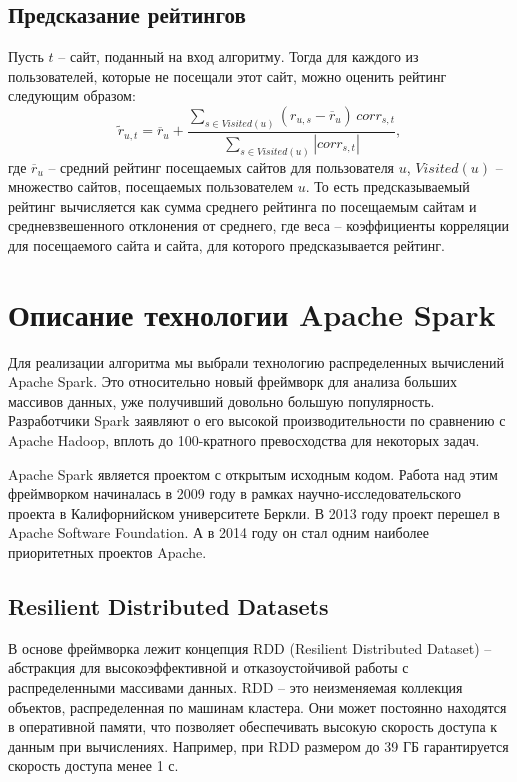 \documentclass[12pt,a4paper]{report}
\newcommand*\mean[1]{\overline{#1}}
\newcommand\abs[1]{\left|#1\right|}
\begin{document}
\subsection{Предсказание рейтингов} 

Пусть $t$ -- сайт, поданный на вход алгоритму. Тогда для каждого из пользователей, которые не посещали этот сайт, можно оценить рейтинг следующим образом:
\begin{equation}
\widetilde{r}_{u,t} = \mean{r}_u + \frac{\sum\limits_{s \in Visited(u)}{ (r_{u,s} - \mean{r}_u) \, corr_{s,t}} }{ \sum\limits_{s \in Visited(u)}{\abs{corr_{s,t}}} } ,
\end{equation}
где $\mean{r}_u$ -- средний рейтинг посещаемых сайтов для пользователя $u$, $Visited(u)$ -- множество сайтов, посещаемых пользователем $u$. То есть предсказываемый рейтинг вычисляется как сумма среднего рейтинга по посещаемым сайтам и средневзвешенного отклонения от среднего, где веса -- коэффициенты корреляции для посещаемого сайта и сайта, для которого предсказывается рейтинг.

\newpage

\section{Описание технологии Apache Spark}

Для реализации алгоритма мы выбрали технологию распределенных вычислений Apache Spark. Это относительно новый фреймворк для анализа больших массивов данных, уже получивший довольно большую популярность. Разработчики Spark заявляют о его высокой производительности по сравнению с Apache Hadoop, вплоть до 100-кратного превосходства для некоторых задач. 

Apache Spark является проектом с открытым исходным кодом. Работа над этим фреймворком начиналась в 2009 году в рамках научно-исследовательского проекта в Калифорнийском университете Беркли. В 2013 году проект перешел в Apache Software Foundation. А в 2014 году он стал одним наиболее приоритетных проектов Apache.

\subsection{Resilient Distributed Datasets} 

В основе фреймворка лежит концепция RDD (Resilient Distributed Dataset) -- абстракция для высокоэффективной и отказоустойчивой работы с распределенными массивами данных. RDD -- это неизменяемая коллекция объектов, распределенная по машинам кластера. Они может постоянно находятся в оперативной памяти, что позволяет обеспечивать высокую скорость доступа к данным при вычислениях. Например, при RDD размером до 39 ГБ гарантируется скорость доступа менее 1 с. 
\end{document}
